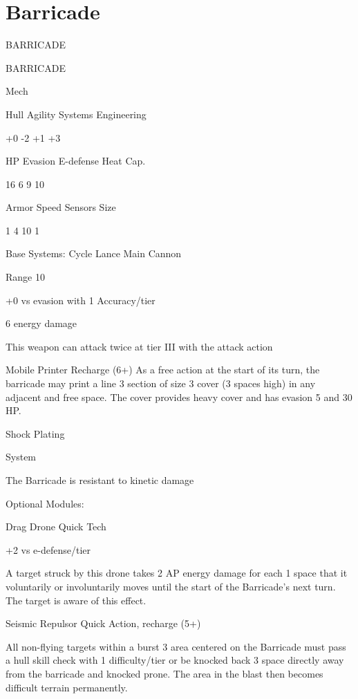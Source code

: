 \section{Barricade}
                                            BARRICADE  

 BARRICADE 

 Mech 

 Hull       Agility     Systems       Engineering 

 +0         -2          +1            +3 

 HP         Evasion     E-defense     Heat Cap. 

 16         6           9             10 

 Armor      Speed       Sensors       Size 

 1          4           10            1 

Base Systems:  
Cycle Lance  
Main Cannon
 
Range 10
 
+0 vs evasion with 1 Accuracy/tier
 
6 energy damage
 
This weapon can attack twice at tier III with the attack action
 

Mobile Printer  
Recharge (6+)  
As a free action at the start of its turn, the barricade may print a line 3 section of size 3 cover (3  
spaces high) in any adjacent and free space. The cover provides heavy cover and has evasion 5  
and 30 HP.
 

Shock Plating
 
System
 
The Barricade is resistant to kinetic damage
 

Optional Modules:
 
Drag Drone  
Quick Tech
 
+2 vs e-defense/tier
 
A target struck by this drone takes 2 AP energy damage for each 1 space that it voluntarily or  
involuntarily moves until the start of the Barricade’s next turn. The target is aware of this effect.
 

Seismic Repulsor  
Quick Action, recharge (5+)
 

                                                                                                       


All non-flying targets within a burst 3 area centered on the Barricade must pass a hull skill check  
with 1 difficulty/tier or be knocked back 3 space directly away from the barricade and knocked  
prone. The area in the blast then becomes difficult terrain permanently.
 

